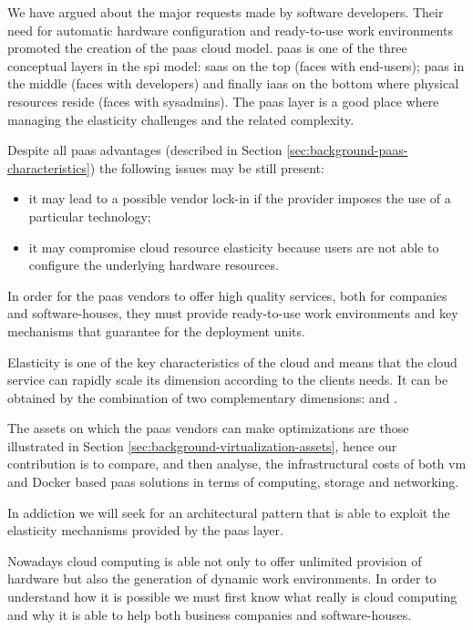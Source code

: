 We have argued about the major requests made by software developers. Their need for automatic
hardware configuration and ready-to-use work environments promoted the creation of the \ac{paas} 
cloud model. \ac{paas} is one of the three conceptual layers in the \ac{spi} model: \ac{saas} on the
top (faces with end-users); \ac{paas} in the middle (faces with developers) and finally \ac{iaas} on
the bottom where physical resources reside (faces with sysadmins). The \ac{paas} layer is a good place
where managing the elasticity challenges and the related complexity.


Despite all \ac{paas} advantages (described in Section \ref{sec:background-paas-characteristics})
the following issues may be still present:

\begin{itemize}
	\item{it may lead to a possible vendor lock-in if the provider imposes the use of a particular
		technology;}
	\item{it may compromise cloud resource elasticity because users are not able to configure the
		underlying hardware resources.}
\end{itemize}

In order for the \ac{paas} vendors to offer high quality services, both for companies and software-houses,
they must provide ready-to-use work environments and key mechanisms that guarantee 
for the deployment units.

Elasticity is one of the key characteristics of the cloud and means that the cloud service can rapidly
scale its dimension according to the clients needs. It can be obtained by the combination of two complementary
dimensions:  and .

The assets on which the \ac{paas} vendors can make optimizations are those illustrated in Section
\ref{sec:background-virtualization-assets}, hence our contribution is to compare, and then analyse, the
infrastructural costs of both \ac{vm} and Docker based \ac{paas} solutions in terms of computing, storage and
networking.

In addiction we will seek for an architectural pattern that is able to exploit the elasticity mechanisms 
provided by the \ac{paas} layer.

Nowadays cloud computing is able not only to offer unlimited provision of hardware but also the generation
of dynamic work environments. In order to understand how it is possible we must first know what really is
cloud computing and why it is able to help both business companies and software-houses.